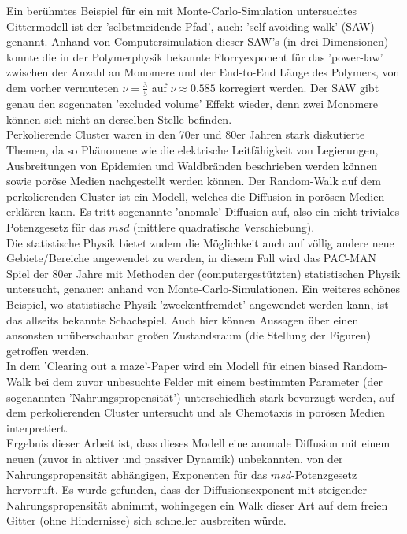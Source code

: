 \documentclass[a4paper, 12pt]{report}
\begin{document}
Ein berühmtes Beispiel für ein mit Monte-Carlo-Simulation untersuchtes Gittermodell ist der 'selbstmeidende-Pfad', auch: 'self-avoiding-walk' (SAW) genannt. Anhand von Computersimulation dieser SAW's (in drei Dimensionen) konnte die in der Polymerphysik bekannte Florryexponent für das 'power-law' zwischen der Anzahl an Monomere und der End-to-End Länge des Polymers, von dem vorher vermuteten $\nu = \frac{3}{5}$ auf $\nu \approx 0.585$ korregiert werden\cite{Grassberger_1993}. Der SAW gibt genau den sogennaten 'excluded volume' Effekt wieder, denn zwei Monomere können sich nicht an derselben Stelle befinden.
\\
\noindent Perkolierende Cluster waren in den 70er und 80er Jahren stark diskutierte Themen, da so Phänomene wie die elektrische Leitfähigkeit von Legierungen, Ausbreitungen von Epidemien und Waldbränden beschrieben werden können \cite{Wiki_Perkolationstheorie} sowie poröse Medien nachgestellt werden können\cite{doi:10.1063/1.4999485}. Der Random-Walk auf dem perkolierenden Cluster ist ein Modell, welches die Diffusion in porösen Medien erklären kann. Es tritt sogenannte 'anomale' Diffusion\cite{PhysRevLett.50.77} auf, also ein nicht-triviales Potenzgesetz für das $msd$ (mittlere quadratische Verschiebung).
\\
\noindent Die statistische Physik bietet zudem die Möglichkeit auch auf völlig andere neue Gebiete/Bereiche angewendet zu werden, in diesem Fall wird das PAC-MAN Spiel der 80er Jahre mit Methoden der (computergestützten) statistischen Physik untersucht\cite{doi:10.1063/1.4999485}, genauer: anhand von Monte-Carlo-Simulationen. Ein weiteres schönes Beispiel, wo statistische Physik 'zweckentfremdet' angewendet werden kann, ist das allseits bekannte Schachspiel. Auch hier können Aussagen über einen ansonsten unüberschaubar großen Zustandsraum (die Stellung der Figuren) getroffen werden\cite{Atashpendar_2016}.
\\
\noindent In dem 'Clearing out a maze'-Paper\cite{doi:10.1063/1.4999485} wird ein Modell für einen biased Random-Walk bei dem zuvor unbesuchte Felder mit einem bestimmten Parameter (der sogenannten 'Nahrungspropensität') unterschiedlich stark bevorzugt werden, auf dem perkolierenden Cluster untersucht und als Chemotaxis in porösen Medien interpretiert.
\\
\noindent Ergebnis dieser Arbeit ist, dass dieses Modell eine anomale Diffusion mit einem neuen (zuvor in aktiver und passiver Dynamik) unbekannten, von der Nahrungspropensität abhängigen, Exponenten für das $msd$-Potenzgesetz hervorruft. Es wurde gefunden, dass der Diffusionsexponent mit steigender Nahrungspropensität abnimmt, wohingegen ein Walk dieser Art auf dem freien Gitter (ohne Hindernisse) sich schneller ausbreiten würde.
\end{document}
